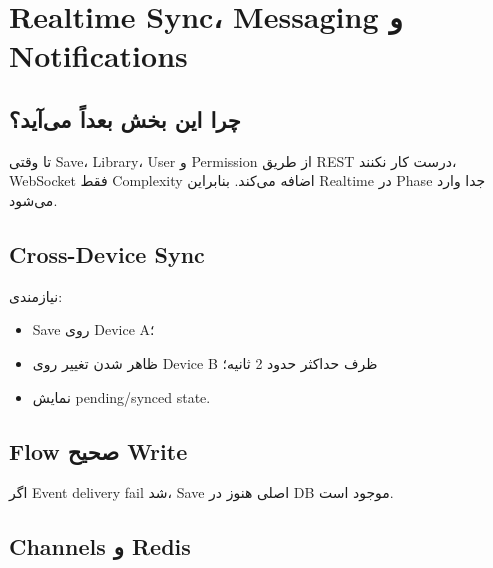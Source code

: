 
\chapter{Realtime Sync، Messaging و Notifications}

\section{چرا این بخش بعداً می‌آید؟}

تا وقتی Save، Library، User و Permission از طریق REST درست کار نکنند، WebSocket فقط Complexity اضافه می‌کند. بنابراین Realtime در Phase جدا وارد می‌شود.

\section{Cross-Device Sync}

نیازمندی:
\begin{itemize}
  \item Save روی Device A؛
  \item ظاهر شدن تغییر روی Device B ظرف حداکثر حدود 2 ثانیه؛
  \item نمایش pending/synced state.
\end{itemize}

\section{Flow صحیح Write}

\begin{center}
\end{center}

اگر Event delivery fail شد، Save اصلی هنوز در DB موجود است.

\section{Channels و Redis}

